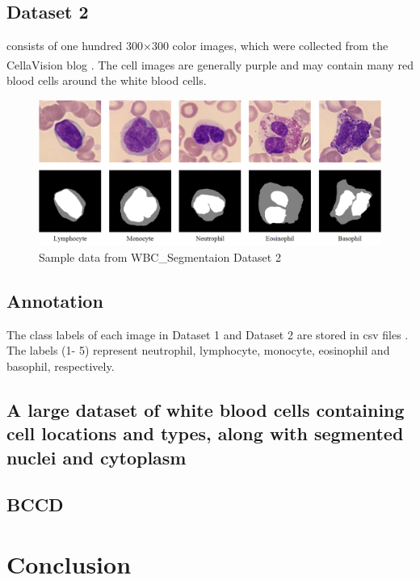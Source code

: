 \subsection{Dataset 2}
consists of one hundred 300×300 color images, which were collected from the CellaVision blog \textsuperscript{\cite{2022_cellavision}}. The cell images are generally purple and may contain many red blood cells around the white blood cells.

\begin{figure}[H]
\centering
\includegraphics[width=\linewidth]{../images/WBC_Dataset2.png}
\caption{Sample data from WBC\_Segmentaion Dataset 2}
\label{fig:WBC_Dataset2_sample}
\end{figure}


\subsection{Annotation}
The class labels of each image in Dataset 1 and Dataset 2 are stored in csv files . The labels (1- 5) represent neutrophil, lymphocyte, monocyte, eosinophil and basophil, respectively.


\subsection{A large dataset of white blood cells containing cell locations and types, along with segmented nuclei and cytoplasm}


\subsection{BCCD}


\newpage
\section{Conclusion}
\hspace*{0.16in}



\newpage

